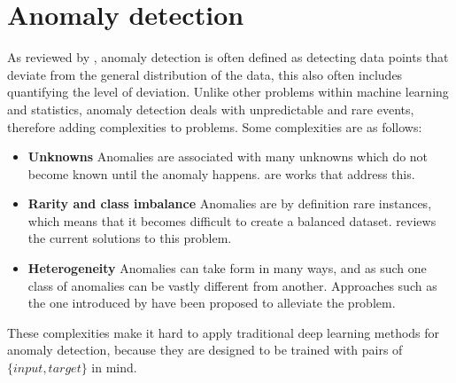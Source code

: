 \section{Anomaly detection}
\label{sec:anomaly_detection}
As reviewed by \textcite{anomaly_detection}, anomaly detection is often defined as detecting data points that deviate from the general distribution of the data, this also often includes quantifying the level of deviation. Unlike other problems within machine learning and statistics, anomaly detection deals with unpredictable and rare events, therefore adding complexities to problems. Some complexities are as follows:
\begin{itemize}
    \item \textbf{Unknowns} Anomalies are associated with many unknowns which do not become known until the anomaly happens. \textcite{unknown_detection1,unknown_detection2} are works that address this.
    \item \textbf{Rarity and class imbalance} Anomalies are by definition rare instances, which means that it becomes difficult to create a balanced dataset. \textcite{class_imbalance1} reviews the current solutions to this problem.
    \item \textbf{Heterogeneity} Anomalies can take form in many ways, and as such one class of anomalies can be vastly different from another. Approaches such as the one introduced by \textcite{heterogeneous1} have been proposed to alleviate the problem.
\end{itemize}
These complexities make it hard to apply traditional deep learning methods for anomaly detection, because they are designed to be trained with pairs of $\{input, target\}$ in mind.
